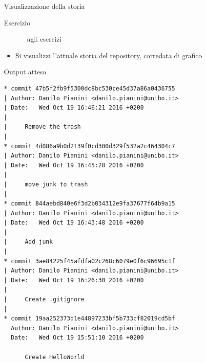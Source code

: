 \documentclass[xcolor=dvipsnames,presentation]{beamer}
\begin{document}
\begin{frame}{Visualizzazione della storia}
\begin{block}{Esercizio}
\begin{itemize}
\begin{itemize}
agli esercizi
            \end{itemize}
            \item Si visualizzi l'attuale storia del repository, corredata di grafico
        \end{itemize}
    \end{block}
    \begin{block}{Output atteso}
        \begin{Verbatim}[fontsize=\tiny]
* commit 47b5f2fb9f5300dc8bc530ce45d37a86a0436755
| Author: Danilo Pianini <danilo.pianini@unibo.it>
| Date:   Wed Oct 19 16:46:21 2016 +0200
|
|     Remove the trash
|
* commit 4d086a9b0d2139f0cd300d329f532a2c464304c7
| Author: Danilo Pianini <danilo.pianini@unibo.it>
| Date:   Wed Oct 19 16:45:28 2016 +0200
|
|     move junk to trash
|
* commit 844aebd840e6f3d2b034312e9fa37677f64b9a15
| Author: Danilo Pianini <danilo.pianini@unibo.it>
| Date:   Wed Oct 19 16:43:48 2016 +0200
|
|     Add junk
|
* commit 3ae84225f45afdfa02c268c6079e0f6c96695c1f
| Author: Danilo Pianini <danilo.pianini@unibo.it>
| Date:   Wed Oct 19 16:26:30 2016 +0200
|
|     Create .gitignore
|
* commit 19aa252373d1e44897233bf5b733cf82019cd5bf
  Author: Danilo Pianini <danilo.pianini@unibo.it>
  Date:   Wed Oct 19 15:51:10 2016 +0200

      Create HelloWorld
        \end{Verbatim}
    \end{block}
\end{frame}

\end{document}
